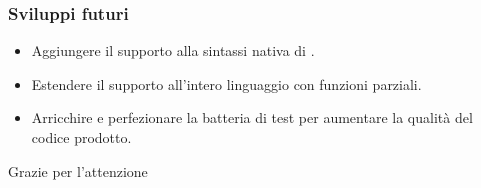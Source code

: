\documentclass{beamer}
\begin{document}

\begin{frame}
  \frametitle{Sviluppi futuri}
  \begin{itemize}
  \item Aggiungere il supporto alla sintassi nativa di \lset{}.
  \item Estendere il supporto all'intero linguaggio \lset{} con funzioni parziali.
  \item Arricchire e perfezionare la batteria di test per aumentare la
    qualità del codice prodotto.
  \end{itemize}
\end{frame}


\begin{frame}
  \Huge{\centerline{Grazie per l'attenzione}}
\end{frame}

\end{document}

